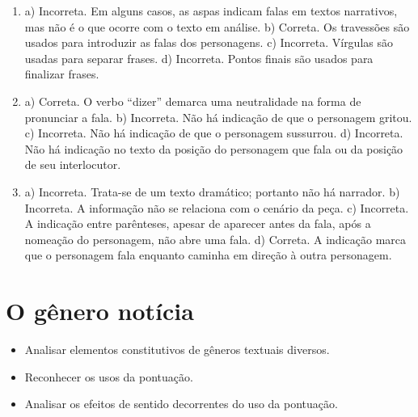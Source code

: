 
\begin{enumerate}\color{rosa}
\item 
a) Incorreta. Em alguns casos, as aspas indicam falas em textos narrativos, mas não é o que ocorre com o texto em análise.
b) Correta. Os travessões são usados para introduzir as falas dos
personagens.
c) Incorreta. Vírgulas são usadas para separar frases.
d) Incorreta. Pontos finais são usados para finalizar frases.

\item
a) Correta. O verbo “dizer” demarca uma neutralidade na forma de pronunciar a fala.
b) Incorreta. Não há indicação de que o personagem gritou.
c) Incorreta. Não há indicação de que o personagem sussurrou.
d) Incorreta. Não há indicação no texto da posição do personagem que fala ou da posição de seu interlocutor.


\item
a) Incorreta. Trata-se de um texto dramático; portanto não há narrador.
b) Incorreta. A informação não se relaciona com o cenário da peça.
c) Incorreta. A indicação entre parênteses, apesar de aparecer antes da fala, após a nomeação do personagem, não abre uma fala.
d) Correta. A indicação marca que o personagem fala enquanto caminha em direção à outra personagem.
\end{enumerate}

\chapter{O gênero notícia}



\begin{itemize}
\item Analisar elementos constitutivos de gêneros textuais diversos.

\item Reconhecer os usos da pontuação.

\item Analisar os efeitos de sentido decorrentes do uso da pontuação.
\end{itemize}

